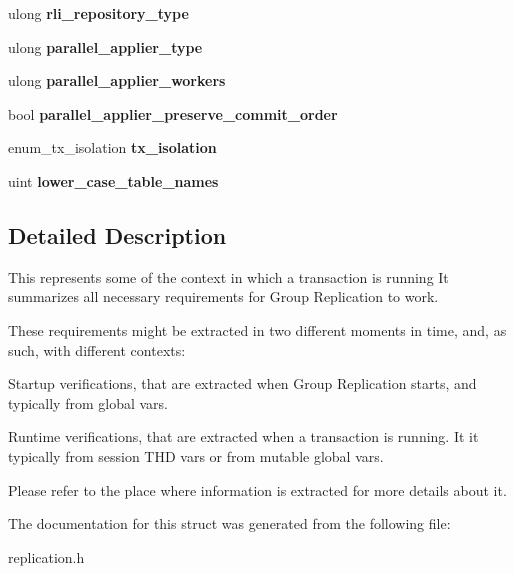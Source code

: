 \begin{DoxyCompactItemize}
ulong {\bfseries rli\+\_\+repository\+\_\+type}
\item 
\mbox{\label{structTrans__context__info_ad4e2a216fc8a02633e8d001fa78f4353}} 
ulong {\bfseries parallel\+\_\+applier\+\_\+type}
\item 
\mbox{\label{structTrans__context__info_a2d58518867c252122da9c25f829ef20c}} 
ulong {\bfseries parallel\+\_\+applier\+\_\+workers}
\item 
\mbox{\label{structTrans__context__info_a16114079a1a61f80c596c3fe6c45700e}} 
bool {\bfseries parallel\+\_\+applier\+\_\+preserve\+\_\+commit\+\_\+order}
\item 
\mbox{\label{structTrans__context__info_a2ae2b5e734b311bee46aff0fe6bbe962}} 
enum\+\_\+tx\+\_\+isolation {\bfseries tx\+\_\+isolation}
\item 
\mbox{\label{structTrans__context__info_af515aeb12bcf0d71dfd0d7b324247b4e}} 
uint {\bfseries lower\+\_\+case\+\_\+table\+\_\+names}
\end{DoxyCompactItemize}


\subsection{Detailed Description}
This represents some of the context in which a transaction is running It summarizes all necessary requirements for Group Replication to work.

These requirements might be extracted in two different moments in time, and, as such, with different contexts\+:
\begin{DoxyItemize}
\item Startup verifications, that are extracted when Group Replication starts, and typically from global vars.
\item Runtime verifications, that are extracted when a transaction is running. It it typically from session T\+HD vars or from mutable global vars.
\end{DoxyItemize}

Please refer to the place where information is extracted for more details about it. 

The documentation for this struct was generated from the following file\+:\begin{DoxyCompactItemize}
\item 
replication.\+h\end{DoxyCompactItemize}
